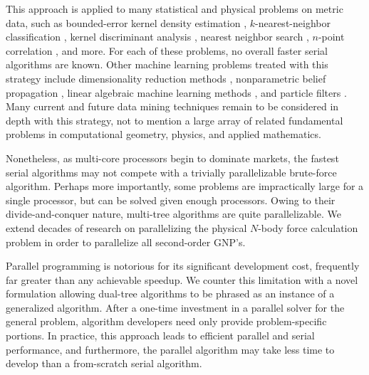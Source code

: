 \documentclass[twoside,leqno,twocolumn]{article}
\begin{document}
This approach is applied to many statistical and physical problems on metric data, such as bounded-error kernel density estimation \cite{gray_nbody, gray_kde, lee_gauss1, lee_gauss2},  $k$-nearest-neighbor classification \cite{ting-liu}, kernel discriminant analysis \cite{nbc-compstat}, nearest neighbor search \cite{gray_nbody}, $n$-point correlation \cite{gray_nbody, moore01fast}, and more.
For each of these problems, no overall faster serial algorithms are known.
Other machine learning problems treated with this strategy include dimensionality reduction methods \cite{hochreiter00beyond}, nonparametric belief propagation \cite{alex-ihler}, linear algebraic machine learning methods \cite{freitas_fast}, and particle filters \cite{klaas-toward}.
Many current and future data mining techniques remain to be considered in depth with this strategy, not to mention a large array of related fundamental problems in computational geometry, physics, and applied mathematics.

Nonetheless, as multi-core processors begin to dominate markets, the fastest serial algorithms may not compete with a trivially parallelizable brute-force algorithm.
Perhaps more importantly, some problems are impractically large for a single processor, but can be solved given enough processors.
Owing to their divide-and-conquer nature, multi-tree algorithms are quite parallelizable.
We extend decades of research on parallelizing the physical $N$-body force calculation problem in order to parallelize all second-order GNP's.

Parallel programming is notorious for its significant development cost, frequently far greater than any achievable speedup.
We counter this limitation with a novel formulation allowing dual-tree algorithms to be phrased as an instance of a generalized algorithm.
After a one-time investment in a parallel solver for the general problem, algorithm developers need only provide problem-specific portions.
In practice, this approach leads to efficient parallel and serial performance, and furthermore, the parallel algorithm may take less time to develop than a from-scratch serial algorithm.
\end{document}

